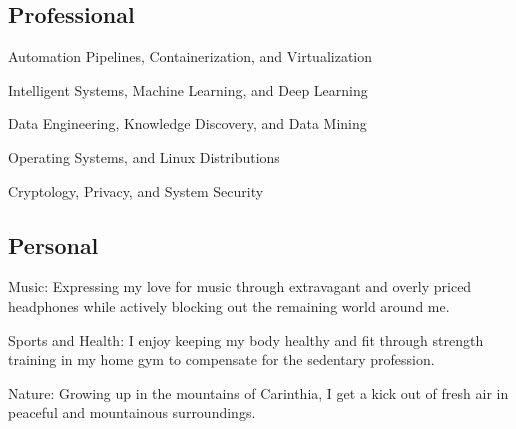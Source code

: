 \documentclass[a4paper]{resume-cv}
\begin{document}
\begin{minipage}[t]{0.56\textwidth}
	\subsection{Professional}
	\vspace{6pt} %
	\begin{tightemize}
		\item Automation Pipelines, Containerization, and Virtualization
		\item Intelligent Systems, Machine Learning, and Deep Learning 
		\item Data Engineering, Knowledge Discovery, and Data Mining
		\item Operating Systems, and Linux Distributions
		\item Cryptology, Privacy, and System Security
	\end{tightemize}
	\subsectionsep
	
	\subsection{Personal}
	\vspace{6pt} %
	\begin{tightemize}
		\item \textsf{Music:} Expressing my love for music through extravagant and overly priced headphones while actively blocking out the remaining world around me.
		\item \textsf{Sports and Health:} I enjoy keeping my body healthy and fit through strength training in my home gym to compensate for the sedentary profession. 
		\item \textsf{Nature:} Growing up in the mountains of Carinthia, I get a kick out of fresh air in peaceful and mountainous surroundings.
	\end{tightemize}
	\subsectionsep
\end{minipage}
\vfill
\end{document}
